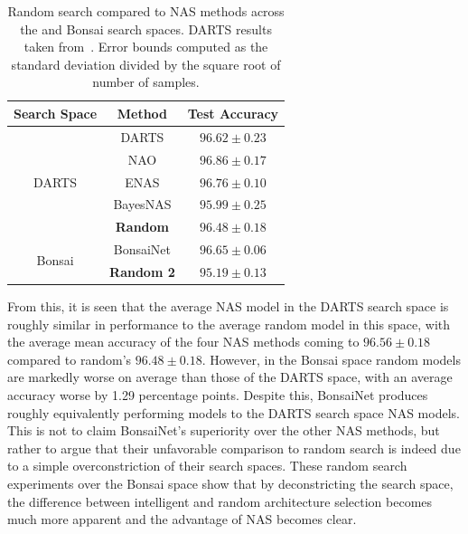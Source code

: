 \begin{table}[h]
\begin{center}
	\begin{tabular}{c|c|c}
	Search Space & Method & Test Accuracy \\
	\hline
	\multirow{5}{*}{DARTS}  	& DARTS	& $96.62\pm0.23$ \\
								& NAO	& $96.86\pm0.17$ \\
								& ENAS	& $96.76\pm0.10$ \\
								& BayesNAS& $95.99\pm0.25$ \\
								& \textbf{Random}  & $\mathbf{96.48\pm0.18}$ \\
	\hline
	\multirow{2}{*}{Bonsai} 	& BonsaiNet	    		& $96.65\pm0.06$  \\
								& \textbf{Random 2}     & $\mathbf{95.19\pm0.13}$  \\
	\end{tabular}
\end{center}
\caption[Random search compared to NAS methods across the~\citeauthor{yu2019} and Bonsai search spaces]{Random search compared to NAS methods across the
\citeauthor{yu2019} and Bonsai search spaces. DARTS results taken from~\cite{yu2019}. Error bounds computed
as the standard deviation divided by the square root of number of samples.}
\label{tab:search_space_comparison}
\end{table}

From this, it is seen that the average NAS model in the DARTS search space is roughly similar in performance to the average
random model in this space, with the average mean accuracy of the four NAS methods coming to $96.56\pm0.18$ compared to random's $96.48\pm0.18$. However,
in the Bonsai space random models are markedly worse on average than those of the DARTS space, with an average accuracy
worse by 1.29 percentage points. Despite this, BonsaiNet produces roughly equivalently performing models to the DARTS search
space NAS models. This is not to claim BonsaiNet's superiority over the other NAS methods, but rather to argue that
their unfavorable comparison to random search is indeed due to a simple overconstriction of their search spaces.
These random search experiments over the Bonsai space show that by deconstricting the search space, the difference between
intelligent and random architecture selection becomes much more apparent and the advantage of NAS becomes clear.

